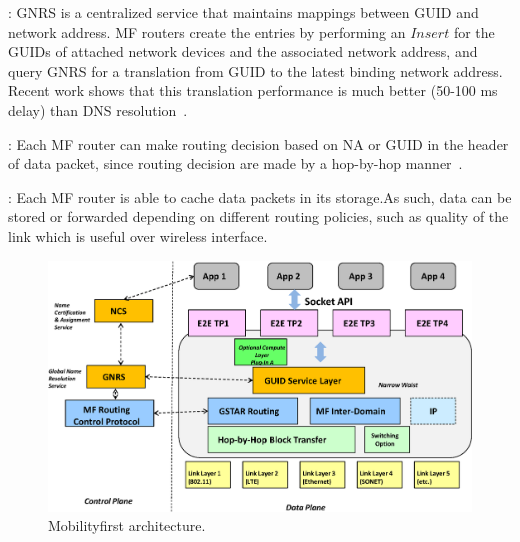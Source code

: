 \vspace{1mm}: GNRS is a centralized service that maintains mappings between GUID and network address. MF routers create the entries by performing an $Insert$ for the GUIDs of attached network devices and the associated network address, and query GNRS for a translation from GUID to the latest binding network address. Recent work shows that this translation performance is much better (50-100 ms delay) than DNS resolution~\cite{vu2012dmap}.

\vspace{1mm}: Each MF router can make routing decision based on NA or GUID in the header of data packet, since routing decision are made by a hop-by-hop manner~\cite{nelson2011gstar}.

\vspace{1mm}: Each MF router is able to cache data packets in its storage.As such,  data can be stored or forwarded depending on different routing policies, such as quality of the link which is  useful over wireless interface.
\vspace{-1mm}
\begin{figure}
\centering
\includegraphics[width=\columnwidth]{figure/mf_arch.eps}
\caption{\label{fig:mf_arch}Mobilityfirst architecture.}
\end{figure}

